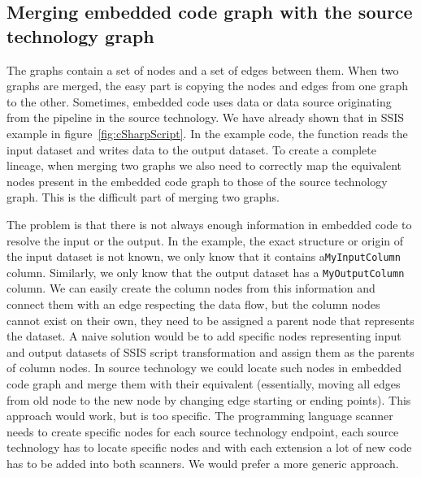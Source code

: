 \subsection{Merging embedded code graph with the source technology graph}
The graphs contain a set of nodes and a set of edges between them. When two graphs are merged, the easy part is copying the nodes and edges from one graph to the other. Sometimes, embedded code uses data or data source originating from the pipeline in the source technology. We have already shown that in SSIS example in figure~\ref{fig:cSharpScript}. In the example code, the function reads the input dataset and writes data to the output dataset. To create a complete lineage, when merging two graphs we also need to correctly map the equivalent nodes present in the embedded code graph to those of the source technology graph. This is the difficult part of merging two graphs.
\par
The problem is that there is not always enough information in embedded code to resolve the input or the output. In the example, the exact structure or origin of the input dataset is not known, we only know that it contains a\texttt{MyInputColumn} column. Similarly, we only know that the output dataset has a \texttt{MyOutputColumn} column. We can easily create the column nodes from this information and connect them with an edge respecting the data flow, but the column nodes cannot exist on their own, they need to be assigned a parent node that represents the dataset. A naive solution would be to add specific nodes representing input and output datasets of SSIS script transformation and assign them as the parents of column nodes. In source technology we could locate such nodes in embedded code graph and merge them with their equivalent (essentially, moving all edges from old node to the new node by changing edge starting or ending points). This approach would work, but is too specific. The programming language scanner needs to create specific nodes for each source technology endpoint, each source technology has to locate specific nodes and with each extension a lot of new code has to be added into both scanners. We would prefer a more generic approach.
\par

